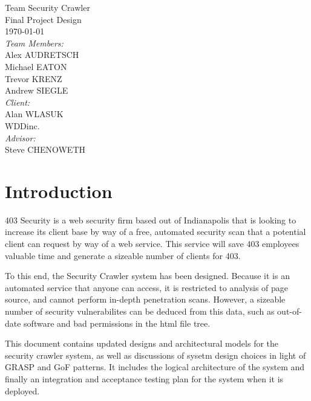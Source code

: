 \documentclass{article}
\begin{document}
\newcommand{\lw}{Low}
\newcommand{\md}{Medium}
\newcommand{\hh}{High}
\fancyhf{}
\rhead{\today}

\begin{titlepage}
\begin{center}
{\huge Team Security Crawler}\\[2cm]
{\Large Final Project Design}\\[2cm]
{\large \today}\\[2cm]
\emph{Team Members:}\\
Alex \uppercase{Audretsch}\\
Michael \uppercase{Eaton}\\
Trevor \uppercase{Krenz}\\
Andrew \uppercase{Siegle}\\[1cm]
\emph{Client:}\\
Alan WLASUK\\
WDDinc.\\[1cm]
\emph{Advisor:}\\
Steve CHENOWETH

\end{center}
\end{titlepage}
\tableofcontents
\newpage
\section{Introduction}

403 Security is a web security firm based out of Indianapolis that is looking to increase its client base by way of a free, automated security scan that a potential client can request by way of a web service.  This service will save 403 employees valuable time and generate a sizeable number of clients for 403.

To this end, the Security Crawler system has been designed.  Because it is an automated service that anyone can access, it is restricted to analysis of page source, and cannot perform in-depth penetration scans.  However, a sizeable number of security vulnerabilites can be deduced from this data, such as out-of-date software and bad permissions in the html file tree.

This document contains updated designs and architectural models for the security crawler system, as well as discussions of sysetm design choices in light of GRASP and GoF patterns.  It includes the logical architecture of the system and finally an integration and acceptance testing plan for the system when it is deployed.
\end{document}
